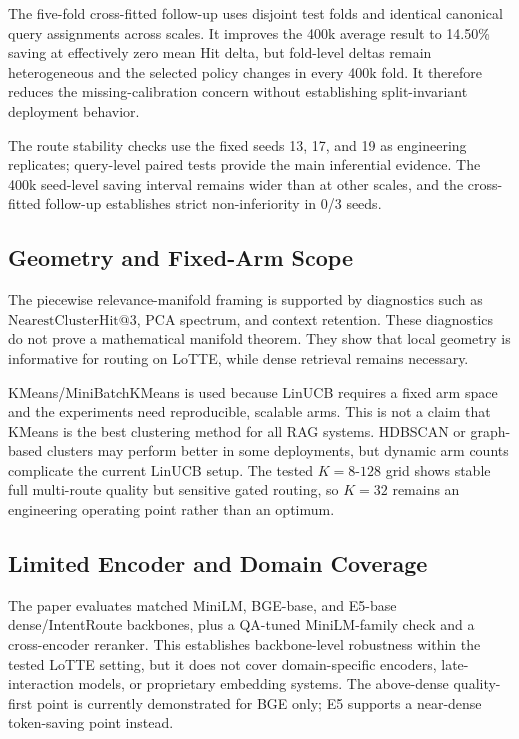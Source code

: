 The five-fold cross-fitted follow-up uses disjoint test folds and identical canonical query assignments across scales. It improves the 400k average result to 14.50\% saving at effectively zero mean Hit delta, but fold-level deltas remain heterogeneous and the selected policy changes in every 400k fold. It therefore reduces the missing-calibration concern without establishing split-invariant deployment behavior.

The route stability checks use the fixed seeds 13, 17, and 19 as engineering replicates; query-level paired tests provide the main inferential evidence. The 400k seed-level saving interval remains wider than at other scales, and the cross-fitted follow-up establishes strict non-inferiority in 0/3 seeds.

\subsection{Geometry and Fixed-Arm Scope}
\label{sec:08-limitations:geometry-and-fixed-arm-scope}

The piecewise relevance-manifold framing is supported by diagnostics such as $\mathrm{NearestClusterHit@3}$, PCA spectrum, and context retention. These diagnostics do not prove a mathematical manifold theorem. They show that local geometry is informative for routing on LoTTE, while dense retrieval remains necessary.

KMeans/MiniBatchKMeans is used because LinUCB requires a fixed arm space and the experiments need reproducible, scalable arms. This is not a claim that KMeans is the best clustering method for all RAG systems. HDBSCAN or graph-based clusters may perform better in some deployments, but dynamic arm counts complicate the current LinUCB setup. The tested $K=8$-$128$ grid shows stable full multi-route quality but sensitive gated routing, so $K=32$ remains an engineering operating point rather than an optimum.

\subsection{Limited Encoder and Domain Coverage}
\label{sec:08-limitations:limited-encoder-and-domain-coverage}

The paper evaluates matched MiniLM, BGE-base, and E5-base dense/IntentRoute backbones, plus a QA-tuned MiniLM-family check and a cross-encoder reranker. This establishes backbone-level robustness within the tested LoTTE setting, but it does not cover domain-specific encoders, late-interaction models, or proprietary embedding systems. The above-dense quality-first point is currently demonstrated for BGE only; E5 supports a near-dense token-saving point instead.

